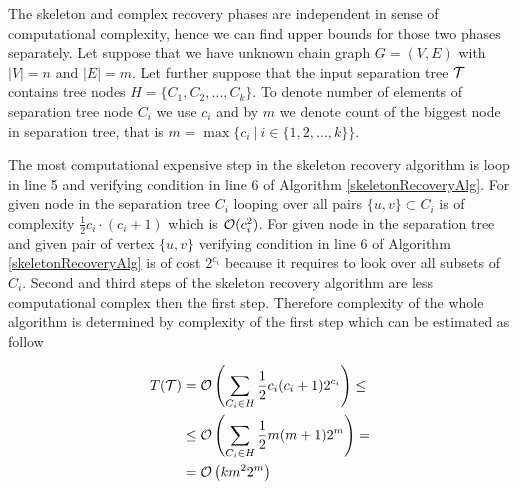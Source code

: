 %
%



The skeleton and complex recovery phases are independent in sense of computational complexity, hence we can
find upper bounds for those two phases separately. 
Let suppose that we have unknown chain graph 
$G = (V, E)$ with $|V| = n$ and $|E| = m$. Let further suppose that the input separation tree $\mathcal{T}$ contains 
tree nodes
$H = \{ C_1, C_2, \dots, C_k \}$. To denote number of elements of separation tree node $C_i$ we use $c_i$ and by
$m$ we denote count of the biggest node in separation tree, that is $m = \max \{ c_i \ | \ i \in \{1, 2, \dots, k \} \}$.

The most computational expensive step in the skeleton recovery algorithm is loop in line 5 and verifying 
condition in line 6 of Algorithm \ref{skeletonRecoveryAlg}. For given node in the separation tree $C_i$ looping over
all pairs $\{u, v\} \subset C_i$ is of complexity $\frac{1}{2} c_i \cdot (c_i + 1)$ which is $\mathcal{O}(c_i^2)$. For given node in the separation
tree and given pair of vertex $\{u, v\}$ verifying condition in line 6 of Algorithm \ref{skeletonRecoveryAlg} is of
cost $2^{c_i}$ because it requires to look over all subsets of $C_i$. Second and third steps of the skeleton
recovery algorithm are less computational complex then the first step. Therefore complexity of the whole algorithm 
is determined by complexity of the first step which can be estimated as follow


\begin{equation}
\begin{split}
	T(\mathcal{T}) & = \mathcal{O} \left( \sum_{C_i \in H} \frac{1}{2} c_i (c_i + 1) 2^{c_i} \right)  \le  \\
	&  \le \mathcal{O} \left( \sum_{C_i \in H} \frac{1}{2}m(m+1)2^{m} \right) =  \\
	& = \mathcal{O} \left( km^2 2^m \right)
\end{split}
\end{equation}






